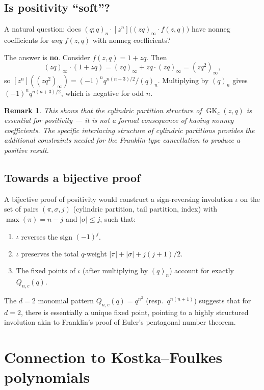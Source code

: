 \documentclass[11pt]{article}
\newtheorem{remark}[theorem]{Remark}
\newcommand{\GK}{\operatorname{GK}}
\begin{document}
\subsection{Is positivity ``soft''?}

A natural question: does $(q;q)_n \cdot [z^n]\bigl((zq)_\infty \cdot f(z,q)\bigr)$
have nonneg coefficients for \emph{any} $f(z,q)$ with nonneg coefficients?

The answer is \textbf{no}. Consider $f(z,q) = 1 + zq$. Then
\[
  (zq)_\infty \cdot (1 + zq) = (zq)_\infty + zq \cdot (zq)_\infty
  = (zq^2)_\infty,
\]
so $[z^n]((zq^2)_\infty) = (-1)^n q^{n(n+3)/2}/(q)_n$. Multiplying by $(q)_n$
gives $(-1)^n q^{n(n+3)/2}$, which is negative for odd $n$.

\begin{remark}
This shows that the cylindric partition structure of $\GK_c(z,q)$ is \emph{essential}
for positivity --- it is not a formal consequence of having nonneg coefficients.
The specific interlacing structure of cylindric partitions provides the additional
constraints needed for the Franklin-type cancellation to produce a positive result.
\end{remark}

\subsection{Towards a bijective proof}

A bijective proof of positivity would construct a sign-reversing involution
$\iota$ on the set of pairs $(\pi, \sigma, j)$ (cylindric partition, tail partition,
index) with $\max(\pi) = n - j$ and $|\sigma| \leq j$, such that:
\begin{enumerate}
  \item $\iota$ reverses the sign $(-1)^j$.
  \item $\iota$ preserves the total $q$-weight $|\pi| + |\sigma| + j(j+1)/2$.
  \item The fixed points of $\iota$ (after multiplying by $(q)_n$) account
    for exactly $Q_{n,c}(q)$.
\end{enumerate}

The $d = 2$ monomial pattern $Q_{n,c}(q) = q^{n^2}$ (resp.\ $q^{n(n+1)}$)
suggests that for $d = 2$, there is essentially a unique fixed point, pointing
to a highly structured involution akin to Franklin's proof of Euler's pentagonal
number theorem.


\section{Connection to Kostka--Foulkes polynomials}
\label{sec:kostka-foulkes}
\end{document}
